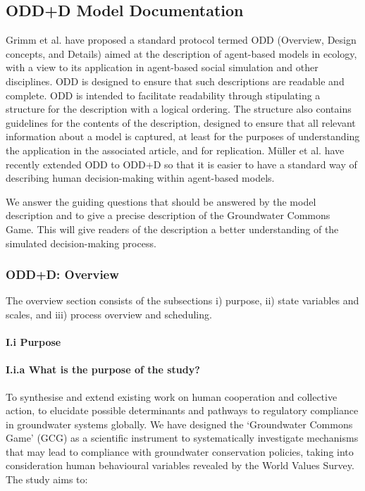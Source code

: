 \documentclass[12pt, a4paper]{article}
\begin{document}
  
\subsection{ODD+D Model Documentation}

Grimm et al.\autocite{Grimm:2006it} have proposed a standard protocol termed ODD (Overview, Design concepts, and Details) aimed at the description of agent-based models in ecology, with a view to its application in agent-based social simulation and other disciplines. ODD is designed to ensure that such descriptions are readable and complete. ODD is intended to facilitate readability through stipulating a structure for the description with a logical ordering. The structure also contains guidelines for the contents of the description, designed to ensure that all relevant information about a model is captured, at least for the purposes of understanding the application in the associated article, and for replication. Müller et al.\autocite{Muller:2013dk} have recently extended ODD to ODD+D so that it is easier to have a standard way of describing human decision-making within agent-based models.

We answer the guiding questions that should be answered by the model description and to give a precise description of the Groundwater Commons Game. This will give readers of the description a better understanding of the simulated decision-making process.

\subsubsection{ODD+D: Overview}

The overview section consists of the subsections i) purpose, ii) state variables and scales, and iii) process overview and scheduling.

\paragraph{I.i Purpose }

\paragraph{I.i.a What is the purpose of the study?}

To synthesise and extend existing work on human cooperation and collective action, to elucidate possible determinants and pathways to regulatory compliance in groundwater systems globally. We have designed the `Groundwater Commons Game' (GCG) as a scientific instrument to systematically investigate mechanisms that may lead to compliance with groundwater conservation policies, taking into consideration human behavioural variables revealed by the World Values Survey. The study aims to:
\end{document}

